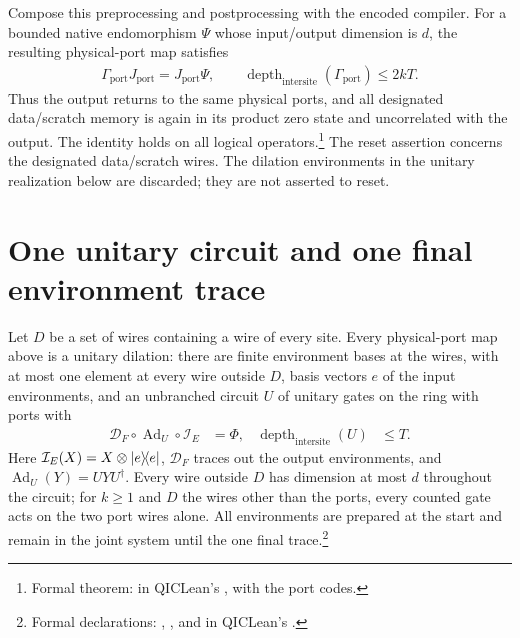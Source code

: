\documentclass{article}
\begin{document}
Compose this preprocessing and postprocessing with the encoded compiler.
For a bounded native endomorphism $\Psi$ whose input/output dimension is
$d$, the resulting physical-port map satisfies
\begin{align}
    \Gamma_{\mathrm{port}}J_{\mathrm{port}}
    = J_{\mathrm{port}}\Psi,
    \qquad \operatorname{depth}_{\mathrm{intersite}}(\Gamma_{\mathrm{port}})
    \le 2kT.
\end{align}
Thus the output returns to the same physical ports, and all designated
data/scratch memory is again in its product zero state and uncorrelated
with the output. The identity holds on all logical operators.\footnote{Formal theorem:
     in QICLean's
    , with the port codes.}
The reset assertion concerns the designated data/scratch wires. The
dilation environments in the unitary realization below are discarded; they
are not asserted to reset.

\section{One unitary circuit and one final environment trace}
Let $D$ be a set of wires containing a wire of every site. Every physical-port
map above is a unitary dilation: there are finite environment bases at the
wires, with at most one element at every wire outside $D$, basis vectors $e$
of the input environments, and an unbranched circuit $U$ of unitary gates on
the ring with ports with
\begin{align}
    \mathcal D_F\circ\operatorname{Ad}_U\circ\mathcal I_E & =\Phi,
                                                          & \operatorname{depth}_{\mathrm{intersite}}(U) & \leq T.
    \label{eq:scope_deferred_dilation}
\end{align}
Here $\mathcal I_E(X)=X\otimes|e\rangle\!\langle e|$, $\mathcal D_F$ traces out the
output environments, and $\operatorname{Ad}_U(Y)=UYU^\dagger$. Every wire
outside $D$ has dimension at most $d$ throughout the circuit; for $k\ge1$ and
$D$ the wires other than the ports, every counted gate acts on the two port
wires alone. All environments are prepared at the start and remain in the
joint system until the one final trace.\footnote{Formal declarations:
    ,
    ,
     and
     in QICLean's
    .}
\end{document}
